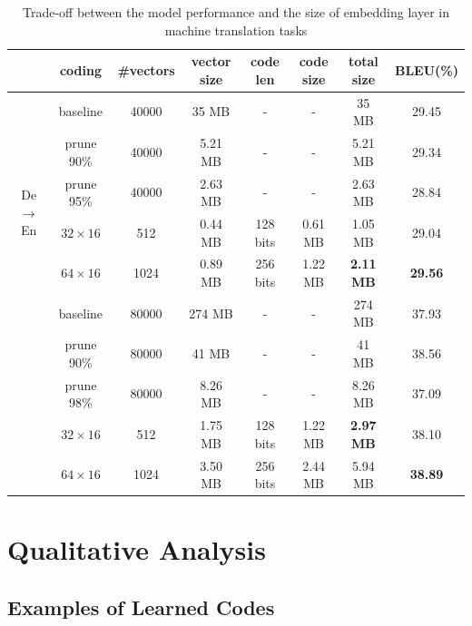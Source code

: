 \documentclass{article} %
\begin{document}
\begin{table}[h]
\begin{center}
    \begin{tabular}{c|c|c|c|c|c|c|c}
    \hline \hline
    & {\bf coding} & {\bf \#vectors}  & {\bf vector size} & {\bf code len} & {\bf code size} & {\bf total size} & {\bf \small BLEU(\%)} \\
    \hline
    \multirow{6 }{*}{\small De $\rightarrow$ En} & baseline & 40000 & 35 MB & - & - & 35 MB & 29.45 \\
    \cline{2-8}
    & prune 90\% & 40000 & 5.21 MB & - & - & 5.21 MB & 29.34 \\
    & prune 95\% & 40000 & 2.63 MB & - & - & 2.63 MB & 28.84 \\
    \cline{2-8}
    & $32 \times 16$ & 512 & 0.44 MB & 128 bits & 0.61 MB & 1.05 MB & 29.04 \\
    & $64 \times 16$ & 1024 & 0.89 MB & 256 bits & 1.22 MB & {\bf 2.11 MB} & {\bf 29.56} \\
    \hline
    \multirow{6}{*}{\small En $\rightarrow$ Ja} & baseline & 80000 & 274 MB & - & - & 274 MB & 37.93 \\
    \cline{2-8}
    & prune 90\% & 80000 & 41 MB & - & - & 41 MB & 38.56 \\
    & prune 98\% & 80000 & 8.26 MB & - & - & 8.26 MB & 37.09 \\
    \cline{2-8}

    & $32 \times 16$ & 512 & 1.75 MB & 128 bits & 1.22 MB & {\bf 2.97 MB} & 38.10 \\
    & $64 \times 16$ & 1024 & 3.50 MB & 256 bits & 2.44 MB & {5.94 MB} & {\bf 38.89} \\
    \hline \hline
    \end{tabular}
    \caption{Trade-off between the model performance and the size of embedding layer in machine translation tasks}
    \label{table:mt}
\end{center}
\end{table}


\section{Qualitative Analysis}

\subsection{Examples of Learned Codes}
\end{document}

